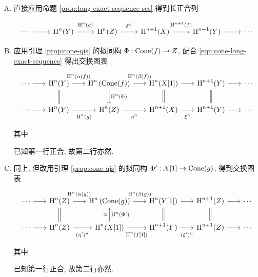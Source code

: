 \begin{enumerate}[(A)]
	\item 直接应用命题 \ref{prop:long-exact-sequence-ses} 得到长正合列
	\[\begin{tikzcd}
		\cdots \arrow[r] & \Hm^n(Y) \arrow[r, "{\Hm^n(g)}" inner sep=0.6em] & \Hm^n(Z) \arrow[r, "{\delta^n}" inner sep=0.6em] & \Hm^{n+1}(X) \arrow[r, "{\Hm^{n+1}(f)}" inner sep=0.6em] & \Hm^{n+1}(Y) \arrow[r] & \cdots
	\end{tikzcd}\]
	\item 应用引理 \ref{prop:cone-qis} 的拟同构 $\Phi: \operatorname{Cone}(f) \to Z$, 配合 \eqref{eqn:cone-long-exact-sequence} 得出交换图表
	\[\begin{tikzcd}[column sep=scriptsize]
		\cdots \arrow[r] & \Hm^n(Y) \arrow[r, "{\Hm^n(\alpha(f))}" inner sep=0.6em] \arrow[equal, d] & \Hm^n\left( \Cone(f) \right) \arrow[r, "{\Hm^n(\beta(f))}" inner sep=0.6em] \arrow[d, "{\Hm^n(\Phi)}"] & \Hm^n(X[1]) \arrow[r] \arrow[equal, d] & \Hm^{n+1}(Y) \arrow[r] \arrow[equal, d] & \cdots \\
		\cdots \arrow[r] & \Hm^n(Y) \arrow[r, "{\Hm^n(g)}"' inner sep=0.6em] & \Hm^n(Z) \arrow[r, "{\eta^n}"' inner sep=0.6em] & \Hm^{n+1}(X) \arrow[r, "{\xi^n}"' inner sep=0.6em] & \Hm^{n+1}(Y) \arrow[r] & \cdots
	\end{tikzcd}\]
	其中
	已知第一行正合, 故第二行亦然.

	\item 同上, 但改用引理 \ref{prop:cone-qis} 的拟同构 $\Phi': X[1] \to \operatorname{Cone}(g)$, 得到交换图表
	\[\begin{tikzcd}[column sep=scriptsize]
		\cdots \arrow[r] & \Hm^n(Z) \arrow[r, "{\Hm^n(\alpha(g))}" inner sep=0.6em] & \Hm^n\left( \Cone(g) \right) \arrow[r, "{\Hm^n(\beta(g))}" inner sep=0.6em] & \Hm^n(Y[1]) \arrow[r] & \Hm^{n+1}(Z) \arrow[r] & \cdots \\
		\cdots \arrow[r] & \Hm^n(Z) \arrow[r, "{(\eta')^n}"' inner sep=0.6em] \arrow[equal, u] & \Hm^n(X[1]) \arrow[r, "{\Hm^n(f[1])}"' inner sep=0.6em] \arrow[u, "{\Hm^n(\Phi')}"', "\simeq"] & \Hm^{n+1}(Y) \arrow[r, "{(\xi')^n}"' inner sep=0.6em] \arrow[equal, u] & \Hm^{n+1}(Z) \arrow[r] \arrow[equal, u] & \cdots
	\end{tikzcd}\]
	其中
	已知第一行正合, 故第二行亦然.
\end{enumerate}

